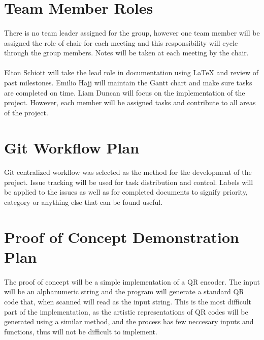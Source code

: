 \documentclass{article}
\begin{document}
\section{Team Member Roles}

	\paragraph{}
	
		There is no team leader assigned for the group, however one team member 
		will be assigned the role of chair for each meeting and this 
		responsibility will cycle through the group members. Notes will be 
		taken at each meeting by the chair.
		
	\paragraph{}
		
		Elton Schiott will take the lead role in documentation using LaTeX and 
		review of past milestones. Emilio Hajj will maintain the Gantt chart 
		and make sure tasks are completed on time. Liam Duncan will focus on 
		the implementation of the project. However, each member will be 
		assigned tasks and contribute to all areas of the project.
		
\section{Git Workflow Plan}

	\paragraph{}
		
		Git centralized workflow was selected as the method for the development of the project. Issue tracking will be used for task distribution and control. Labels will be applied to the issues as well as for completed documents to signify priority, category or anything else that can be found useful.
		
\section{Proof of Concept Demonstration Plan}

	\paragraph{}
		
		The proof of concept will be a simple implementation of a QR encoder. 
		The input will be an alphanumeric string and the program will generate 
		a standard QR code that, when scanned will read as the input string. 
		This is the most difficult part of the implementation, as the artistic 
		representations of QR codes will be generated using a similar method, 
		and the process has few neccesary inputs and functions, thus will not be difficult to 
		implement. 
		
\end{document}
